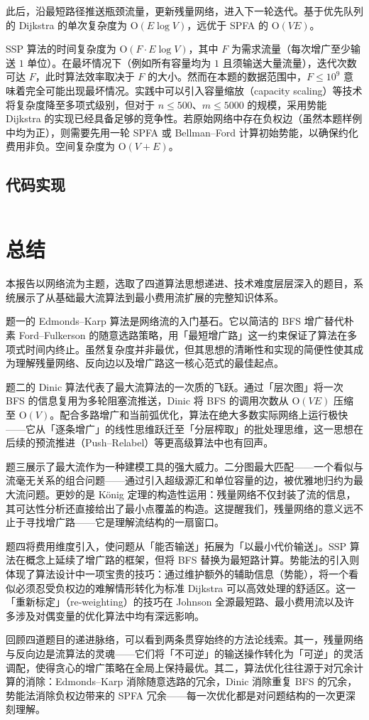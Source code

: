 \documentclass[12pt, a4paper]{academics}
\begin{document}
此后，沿最短路径推送瓶颈流量，更新残量网络，进入下一轮迭代。基于优先队列的 Dijkstra 的单次复杂度为 $\mathrm{O}(E \log V)$，远优于 SPFA 的 $\mathrm{O}(VE)$。

SSP 算法的时间复杂度为 $\mathrm{O}(F \cdot E \log V)$，其中 $F$ 为需求流量（每次增广至少输送 $1$ 单位）。在最坏情况下（例如所有容量均为 $1$ 且须输送大量流量），迭代次数可达 $F$，此时算法效率取决于 $F$ 的大小。然而在本题的数据范围中，$F \le 10^9$ 意味着完全可能出现最坏情况。实践中可以引入容量缩放（capacity scaling）等技术将复杂度降至多项式级别，但对于 $n \le 500$、$m \le 5000$ 的规模，采用势能 Dijkstra 的实现已经具备足够的竞争性。若原始网络中存在负权边（虽然本题样例中均为正），则需要先用一轮 SPFA 或 Bellman--Ford 计算初始势能，以确保约化费用非负。空间复杂度为 $\mathrm{O}(V + E)$。

\subsection{代码实现}

\inputminted{c++}{../src/p4_mincost_flow.cpp}

\section{总结}

本报告以网络流为主题，选取了四道算法思想递进、技术难度层层深入的题目，系统展示了从基础最大流算法到最小费用流扩展的完整知识体系。

题一的 Edmonds--Karp 算法是网络流的入门基石。它以简洁的 BFS 增广替代朴素 Ford--Fulkerson 的随意选路策略，用「最短增广路」这一约束保证了算法在多项式时间内终止。虽然复杂度并非最优，但其思想的清晰性和实现的简便性使其成为理解残量网络、反向边以及增广路这一核心范式的最佳起点。

题二的 Dinic 算法代表了最大流算法的一次质的飞跃。通过「层次图」将一次 BFS 的信息复用为多轮阻塞流推送，Dinic 将 BFS 的调用次数从 $\mathrm{O}(VE)$ 压缩至 $\mathrm{O}(V)$。配合多路增广和当前弧优化，算法在绝大多数实际网络上运行极快——它从「逐条增广」的线性思维跃迁至「分层榨取」的批处理思维，这一思想在后续的预流推进（Push--Relabel）等更高级算法中也有回声。

题三展示了最大流作为一种建模工具的强大威力。二分图最大匹配——一个看似与流毫无关系的组合问题——通过引入超级源汇和单位容量的边，被优雅地归约为最大流问题。更妙的是 K\"onig 定理的构造性运用：残量网络不仅封装了流的信息，其可达性分析还直接给出了最小点覆盖的构造。这提醒我们，残量网络的意义远不止于寻找增广路——它是理解流结构的一扇窗口。

题四将费用维度引入，使问题从「能否输送」拓展为「以最小代价输送」。SSP 算法在概念上延续了增广路的框架，但将 BFS 替换为最短路计算。势能法的引入则体现了算法设计中一项宝贵的技巧：通过维护额外的辅助信息（势能），将一个看似必须忍受负权边的难解情形转化为标准 Dijkstra 可以高效处理的舒适区。这一「重新标定」（re-weighting）的技巧在 Johnson 全源最短路、最小费用流以及许多涉及对偶变量的优化算法中均有深远影响。

回顾四道题目的递进脉络，可以看到两条贯穿始终的方法论线索。其一，残量网络与反向边是流算法的灵魂——它们将「不可逆」的输送操作转化为「可逆」的灵活调配，使得贪心的增广策略在全局上保持最优。其二，算法优化往往源于对冗余计算的消除：Edmonds--Karp 消除随意选路的冗余，Dinic 消除重复 BFS 的冗余，势能法消除负权边带来的 SPFA 冗余——每一次优化都是对问题结构的一次更深刻理解。
\end{document}
